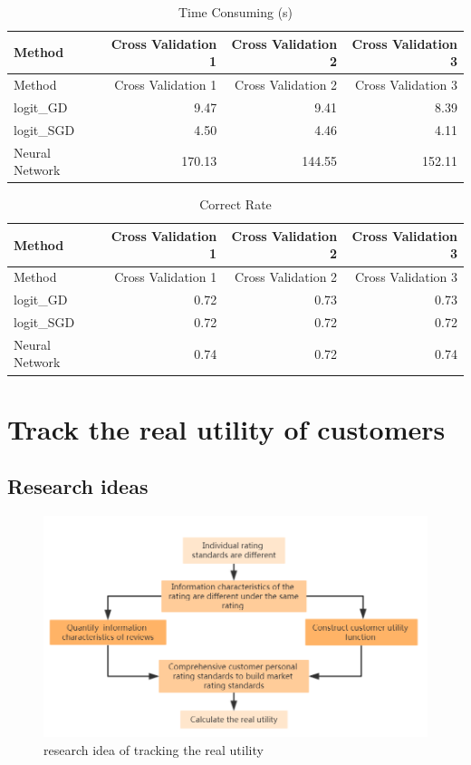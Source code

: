 \documentclass[12pt,a4paper,]{article}
\begin{document}
\begin{longtable}[]{@{}lrrr@{}}
\caption{Time Consuming (s)}\tabularnewline
\toprule
Method & Cross Validation 1 & Cross Validation 2 & Cross Validation
3\tabularnewline
\midrule
\endfirsthead
\toprule
Method & Cross Validation 1 & Cross Validation 2 & Cross Validation
3\tabularnewline
\midrule
\endhead
logit\_GD & 9.47 & 9.41 & 8.39\tabularnewline
logit\_SGD & 4.50 & 4.46 & 4.11\tabularnewline
Neural Network & 170.13 & 144.55 & 152.11\tabularnewline
\bottomrule
\end{longtable}

\begin{longtable}[]{@{}lrrr@{}}
\caption{Correct Rate}\tabularnewline
\toprule
Method & Cross Validation 1 & Cross Validation 2 & Cross Validation
3\tabularnewline
\midrule
\endfirsthead
\toprule
Method & Cross Validation 1 & Cross Validation 2 & Cross Validation
3\tabularnewline
\midrule
\endhead
logit\_GD & 0.72 & 0.73 & 0.73\tabularnewline
logit\_SGD & 0.72 & 0.72 & 0.72\tabularnewline
Neural Network & 0.74 & 0.72 & 0.74\tabularnewline
\bottomrule
\end{longtable}

\hypertarget{track-the-real-utility-of-customers}{%
\section{Track the real utility of
customers}\label{track-the-real-utility-of-customers}}

\hypertarget{research-ideas-2}{%
\subsection{Research ideas}\label{research-ideas-2}}

\begin{figure}

{\centering \includegraphics[width=0.6\linewidth]{fig2} 

}

\caption{research idea of tracking the real utility}\label{fig:unnamed-chunk-20}
\end{figure}
\end{document}
